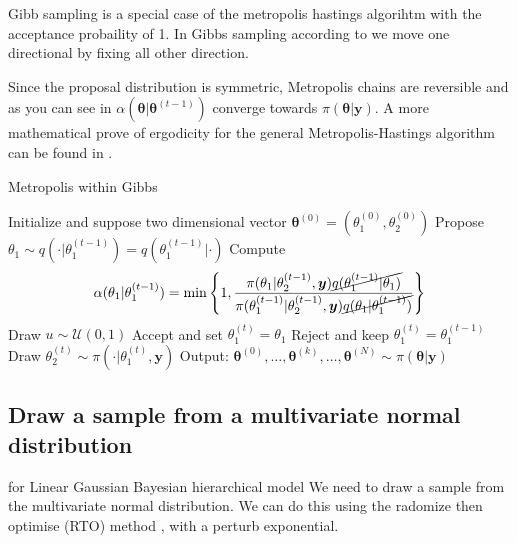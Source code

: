 Gibb sampling is a special case of the metropolis hastings algorihtm with the acceptance probaility of 1.
In Gibbs sampling according to \cite{} we move one directional by fixing all other direction.


Since the proposal distribution is symmetric, Metropolis chains are reversible and as you can see in $\alpha(\bm{\theta} | \bm{\theta}^{(t-1)})$ converge towards $\pi(\bm{\theta}| \bm{y})$.
A more mathematical prove of ergodicity for the general Metropolis-Hastings algorithm can be found in \cite{}.

\begin{algorithm}
	\caption{Metropolis within Gibbs}
	\begin{algorithmic}[1]
		\STATE Initialize and suppose two dimensional vector \( \bm{\theta}^{(0)}  =( \theta_1^{(0)} , \theta_2^{(0)}  ) \)
		\STATE Propose \( \theta_1 \sim q(\cdot   | \theta_1 ^{(t-1)}) = q(\theta_1 ^{(t-1)} |\cdot  ) \)
		\STATE Compute
		\[ \alpha( \theta_1  | \theta_1^{(t-1)}) = \min \left\{ 1, \frac{\pi(\theta_1  | \theta^{(t-1)}_2, \bm{y}) \cancel{q(\theta_1^{(t-1)} | \theta_1 ) } }{\pi(\theta_1^{(t-1)}| \theta_2^{(t-1)}, \bm{y}) \cancel{q(\theta_1 | \theta_1^{(t-1)})} } \right\} \]
		\STATE Draw $u \sim \mathcal{U}(0,1)$
		\STATE Accept and set \( \theta_1^{(t)} = \theta_1 \)
		\ELSE  
		\STATE Reject and keep \(\theta_1^{(t)} = \theta_1^{(t-1)} \)
		\ENDIF
		\STATE Draw \(\theta_2^{(t)} \sim  \pi( \cdot | \theta_1^{(t)} , \bm{y} )\) 
		\ENDFOR
		\STATE Output: $ \bm{\theta}^{(0)}, \dots,  \bm{\theta}^{(k)} , \dots,   \bm{\theta}^{(N)} \sim \pi(\bm{\theta}| \bm{y}) $
	\end{algorithmic}
\end{algorithm}


\subsection{Draw a sample from a multivariate normal distribution}
for Linear Gaussian Bayesian hierarchical model We need to draw a sample from the multivariate normal distribution.
We can do this using the radomize then optimise (RTO) method \cite{}, with a perturb exponential.

